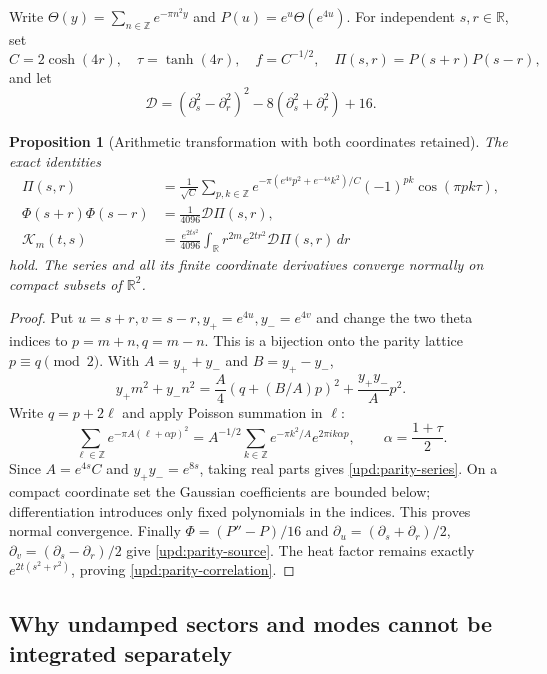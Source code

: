 \documentclass[11pt]{article}
\numberwithin{equation}{section}
\newtheorem{proposition}[theorem]{Proposition}
\theoremstyle{definition}
\theoremstyle{remark}
\newcommand{\R}{\mathbb R}
\newcommand{\dd}{\,d}
\begin{document}
Write $\Theta(y)=\sum_{n\in\mathbb Z}e^{-\pi n^2y}$ and
$P(u)=e^u\Theta(e^{4u})$. For independent $s,r\in\R$, set
\[
 C=2\cosh(4r),\quad \tau=\tanh(4r),\quad f=C^{-1/2},\quad
 \Pi(s,r)=P(s+r)P(s-r),
\]
and let
\[
 \mathscr D=(\partial_s^2-\partial_r^2)^2
                    -8(\partial_s^2+\partial_r^2)+16.
\]
\begin{proposition}[Arithmetic transformation with both coordinates retained]
\label{upd:parity-poisson}
The exact identities
\begin{align}
 \Pi(s,r)&=\frac1{\sqrt C}\sum_{p,k\in\mathbb Z}
 e^{-\pi(e^{4s}p^2+e^{-4s}k^2)/C}
                  (-1)^{pk}\cos(\pi pk\tau),\label{upd:parity-series}\\
 \Phi(s+r)\Phi(s-r)&=\frac1{4096}\mathscr D\Pi(s,r),
 \label{upd:parity-source}\\
 \mathscr K_m(t,s)&=\frac{e^{2ts^2}}{4096}
       \int_{\R}r^{2m}e^{2tr^2}\mathscr D\Pi(s,r)\dd r
 \label{upd:parity-correlation}
\end{align}
hold.  The series and all its finite coordinate derivatives converge
normally on compact subsets of $\R^2$.
\end{proposition}
\begin{proof}
Put $u=s+r,v=s-r,y_+=e^{4u},y_-=e^{4v}$ and change the two
theta indices to $p=m+n,q=m-n$.  This is a bijection onto the parity
lattice $p\equiv q\pmod2$.  With $A=y_++y_-$ and $B=y_+-y_-$,
\[
 y_+m^2+y_-n^2=\frac A4(q+(B/A)p)^2+\frac{y_+y_-}{A}p^2.
\]
Write $q=p+2\ell$ and apply Poisson summation in $\ell$:
\[
 \sum_{\ell\in\mathbb Z}e^{-\pi A(\ell+\alpha p)^2}
 =A^{-1/2}\sum_{k\in\mathbb Z}e^{-\pi k^2/A}e^{2\pi i k\alpha p},
 \qquad \alpha=\frac{1+\tau}{2}.
\]
Since $A=e^{4s}C$ and $y_+y_-=e^{8s}$, taking real parts gives
\eqref{upd:parity-series}.  On a compact coordinate set the Gaussian
coefficients are bounded below; differentiation introduces only fixed
polynomials in the indices.  This proves normal convergence.
Finally $\Phi=(P''-P)/16$ and
$\partial_u=(\partial_s+\partial_r)/2$,
$\partial_v=(\partial_s-\partial_r)/2$ give
\eqref{upd:parity-source}.  The heat factor remains exactly
$e^{2t(s^2+r^2)}$, proving \eqref{upd:parity-correlation}.
\end{proof}

\subsection{Why undamped sectors and modes cannot be integrated separately}
\end{document}
